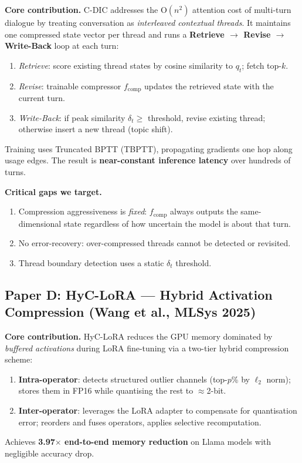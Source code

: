 \documentclass[11pt, a4paper]{article}
\begin{document}
\textbf{Core contribution.} C-DIC addresses the O$(n^2)$ attention cost of multi-turn dialogue by treating conversation as \emph{interleaved contextual threads}. It maintains one compressed state vector per thread and runs a \textbf{Retrieve $\to$ Revise $\to$ Write-Back} loop at each turn:
\begin{enumerate}[leftmargin=*, itemsep=2pt]
  \item \textit{Retrieve}: score existing thread states by cosine similarity to $q_t$; fetch top-$k$.
  \item \textit{Revise}: trainable compressor $f_{\text{comp}}$ updates the retrieved state with the current turn.
  \item \textit{Write-Back}: if peak similarity $\delta_t \geq$ threshold, revise existing thread; otherwise insert a new thread (topic shift).
\end{enumerate}
Training uses Truncated BPTT (TBPTT), propagating gradients one hop along usage edges. The result is \textbf{near-constant inference latency} over hundreds of turns.

\textbf{Critical gaps we target.}
\begin{enumerate}[leftmargin=*, itemsep=2pt]
  \item Compression aggressiveness is \textit{fixed}: $f_{\text{comp}}$ always outputs the same-dimensional state regardless of how uncertain the model is about that turn.
  \item No error-recovery: over-compressed threads cannot be detected or revisited.
  \item Thread boundary detection uses a static $\delta_t$ threshold.
\end{enumerate}

\subsection{Paper D: HyC-LoRA --- Hybrid Activation Compression (Wang et al., MLSys 2025)}
\label{sec:hyclora}

\textbf{Core contribution.} HyC-LoRA reduces the GPU memory dominated by \emph{buffered activations} during LoRA fine-tuning via a two-tier hybrid compression scheme:
\begin{enumerate}[leftmargin=*, itemsep=2pt]
  \item \textbf{Intra-operator}: detects structured outlier channels (top-$p$\% by $\ell_2$ norm); stores them in FP16 while quantising the rest to $\approx$2-bit.
  \item \textbf{Inter-operator}: leverages the LoRA adapter to compensate for quantisation error; reorders and fuses operators, applies selective recomputation.
\end{enumerate}
Achieves \textbf{3.97$\times$ end-to-end memory reduction} on Llama models with negligible accuracy drop.
\end{document}

